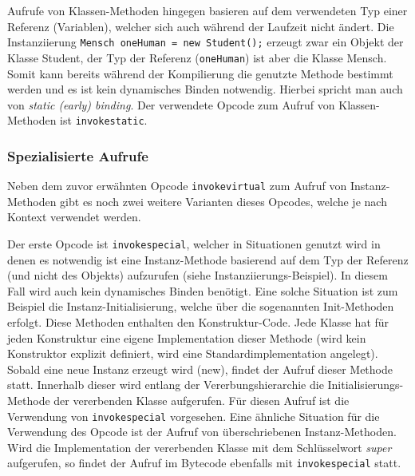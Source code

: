 \documentclass[conference]{IEEEtran}
\begin{document}
Aufrufe von Klassen-Methoden hingegen basieren auf dem verwendeten Typ einer Referenz (Variablen), welcher sich auch während der Laufzeit nicht ändert. Die Instanziierung \verb|Mensch oneHuman = new Student();| erzeugt zwar ein Objekt der Klasse Student, der Typ der Referenz (\verb|oneHuman|) ist aber die Klasse Mensch. Somit kann bereits während der Kompilierung die genutzte Methode bestimmt werden und es ist kein dynamisches Binden notwendig. Hierbei spricht man auch von \textit{static (early) binding}. Der verwendete Opcode zum Aufruf von Klassen-Methoden ist \verb|invokestatic|. \cite{Venners.1997}

\subsubsection{Spezialisierte Aufrufe}
Neben dem zuvor erwähnten Opcode \verb|invokevirtual| zum Aufruf von Instanz-Methoden gibt es noch zwei weitere Varianten dieses Opcodes, welche je nach Kontext verwendet werden. 

Der erste Opcode ist \verb|invokespecial|, welcher in Situationen genutzt wird in denen es notwendig ist eine Instanz-Methode basierend auf dem Typ der Referenz (und nicht des Objekts) aufzurufen (siehe Instanziierungs-Beispiel). In diesem Fall wird auch kein dynamisches Binden benötigt. Eine solche Situation ist zum Beispiel die Instanz-Initialisierung, welche über die sogenannten Init-Methoden erfolgt. Diese Methoden enthalten den Konstruktur-Code. Jede Klasse hat für jeden Konstruktur eine eigene Implementation dieser Methode (wird kein Konstruktor explizit definiert, wird eine Standardimplementation angelegt). Sobald eine neue Instanz erzeugt wird (new), findet der Aufruf dieser Methode statt. Innerhalb dieser wird entlang der Vererbungshierarchie die Initialisierungs-Methode der vererbenden Klasse aufgerufen. Für diesen Aufruf ist die Verwendung von \verb|invokespecial| vorgesehen. Eine ähnliche Situation für die Verwendung des Opcode ist der Aufruf von überschriebenen Instanz-Methoden. Wird die Implementation der vererbenden Klasse mit dem Schlüsselwort \textit{super} aufgerufen, so findet der Aufruf im Bytecode ebenfalls mit \verb|invokespecial| statt.
\end{document}
